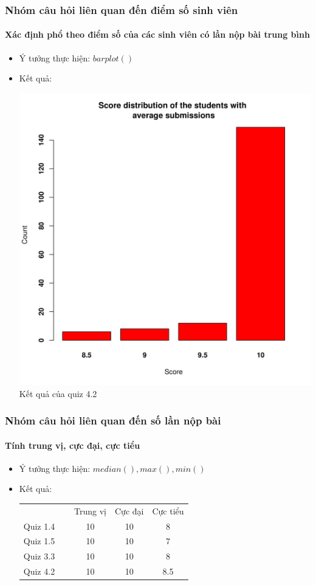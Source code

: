 \documentclass[english,10pt,table]{beamer}
\begin{document}
\frame
{
\frametitle{Nhóm câu hỏi liên quan đến điểm số sinh viên}
\framesubtitle{Xác định phổ theo điểm số của các sinh viên có lần nộp bài trung bình}
\begin{itemize}
    \item Ý tưởng thực hiện: $barplot()$
    \item Kết quả:\\
    \begin{center}
        \includegraphics[width = 6 cm]{Images/img3-3-4.png}\\
        Kết quả của quiz 4.2
    \end{center}
\end{itemize}
}

\frame
{
\frametitle{Nhóm câu hỏi liên quan đến số lần nộp bài}
\framesubtitle{Tính trung vị, cực đại, cực tiểu}
\begin{itemize}
    \item Ý tưởng thực hiện: $median(), max(), min()$
    \item Kết quả:\\
    \begin{center}
        \begin{tabular}{l l c c c}
             & & Trung vị & Cực đại & Cực tiểu\\
             Quiz 1.4 & $\;$ & 10 & 10 & 8\\
             Quiz 1.5 & $\;$ & 10 & 10 & 7\\
             Quiz 3.3 & $\;$ & 10 & 10 & 8\\
             Quiz 4.2 & $\;$ & 10 & 10 & 8.5
        \end{tabular}
    \end{center}
\end{itemize}
}
\end{document}
